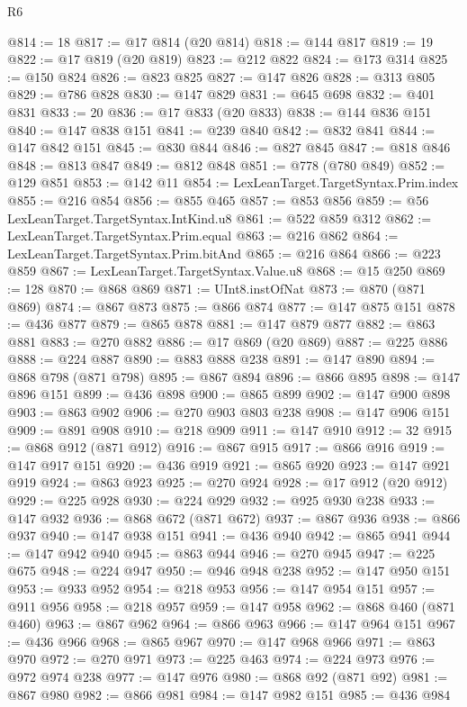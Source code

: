\begin{lexlean}{R6}
\begin{coremodule}
@814 := 18
@817 := @17 @814 (@20 @814)
@818 := @144 @817
@819 := 19
@822 := @17 @819 (@20 @819)
@823 := @212 @822
@824 := @173 @314
@825 := @150 @824
@826 := @823 @825
@827 := @147 @826
@828 := @313 @805
@829 := @786 @828
@830 := @147 @829
@831 := @645 @698
@832 := @401 @831
@833 := 20
@836 := @17 @833 (@20 @833)
@838 := @144 @836 @151
@840 := @147 @838 @151
@841 := @239 @840
@842 := @832 @841
@844 := @147 @842 @151
@845 := @830 @844
@846 := @827 @845
@847 := @818 @846
@848 := @813 @847
@849 := @812 @848
@851 := @778 (@780 @849)
@852 := @129 @851
@853 := @142 @11
@854 := LexLeanTarget.TargetSyntax.Prim.index
@855 := @216 @854
@856 := @855 @465
@857 := @853 @856
@859 := @56 LexLeanTarget.TargetSyntax.IntKind.u8
@861 := @522 @859 @312
@862 := LexLeanTarget.TargetSyntax.Prim.equal
@863 := @216 @862
@864 := LexLeanTarget.TargetSyntax.Prim.bitAnd
@865 := @216 @864
@866 := @223 @859
@867 := LexLeanTarget.TargetSyntax.Value.u8
@868 := @15 @250
@869 := 128
@870 := @868 @869
@871 := UInt8.instOfNat
@873 := @870 (@871 @869)
@874 := @867 @873
@875 := @866 @874
@877 := @147 @875 @151
@878 := @436 @877
@879 := @865 @878
@881 := @147 @879 @877
@882 := @863 @881
@883 := @270 @882
@886 := @17 @869 (@20 @869)
@887 := @225 @886
@888 := @224 @887
@890 := @883 @888 @238
@891 := @147 @890
@894 := @868 @798 (@871 @798)
@895 := @867 @894
@896 := @866 @895
@898 := @147 @896 @151
@899 := @436 @898
@900 := @865 @899
@902 := @147 @900 @898
@903 := @863 @902
@906 := @270 @903 @803 @238
@908 := @147 @906 @151
@909 := @891 @908
@910 := @218 @909
@911 := @147 @910
@912 := 32
@915 := @868 @912 (@871 @912)
@916 := @867 @915
@917 := @866 @916
@919 := @147 @917 @151
@920 := @436 @919
@921 := @865 @920
@923 := @147 @921 @919
@924 := @863 @923
@925 := @270 @924
@928 := @17 @912 (@20 @912)
@929 := @225 @928
@930 := @224 @929
@932 := @925 @930 @238
@933 := @147 @932
@936 := @868 @672 (@871 @672)
@937 := @867 @936
@938 := @866 @937
@940 := @147 @938 @151
@941 := @436 @940
@942 := @865 @941
@944 := @147 @942 @940
@945 := @863 @944
@946 := @270 @945
@947 := @225 @675
@948 := @224 @947
@950 := @946 @948 @238
@952 := @147 @950 @151
@953 := @933 @952
@954 := @218 @953
@956 := @147 @954 @151
@957 := @911 @956
@958 := @218 @957
@959 := @147 @958
@962 := @868 @460 (@871 @460)
@963 := @867 @962
@964 := @866 @963
@966 := @147 @964 @151
@967 := @436 @966
@968 := @865 @967
@970 := @147 @968 @966
@971 := @863 @970
@972 := @270 @971
@973 := @225 @463
@974 := @224 @973
@976 := @972 @974 @238
@977 := @147 @976
@980 := @868 @92 (@871 @92)
@981 := @867 @980
@982 := @866 @981
@984 := @147 @982 @151
@985 := @436 @984

\end{coremodule}
\end{lexlean}
